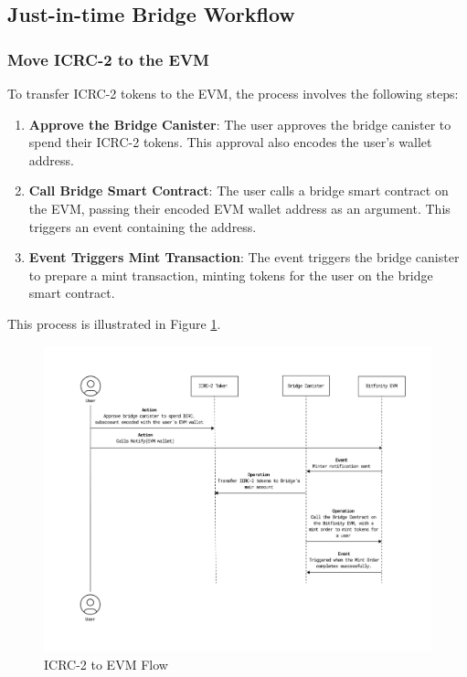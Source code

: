 \documentclass{article}
\begin{document}
\subsection{Just-in-time Bridge Workflow}

\subsubsection{Move ICRC-2 to the EVM}

To transfer ICRC-2 tokens to the EVM, the process involves the following steps:

\begin{enumerate}
\item \textbf{Approve the Bridge Canister}: The user approves the bridge canister to spend their ICRC-2 tokens. This approval also encodes the user's wallet address.
\item \textbf{Call Bridge Smart Contract}: The user calls a bridge smart contract on the EVM, passing their encoded EVM wallet address as an argument. This triggers an event containing the address.
\item \textbf{Event Triggers Mint Transaction}: The event triggers the bridge canister to prepare a mint transaction, minting tokens for the user on the bridge smart contract.
\end{enumerate}

This process is illustrated in Figure \ref{fig
}.

\begin{figure}[H]
\centering
\includegraphics[width=1\linewidth]{icrc-evm.png}
\caption{ICRC-2 to EVM Flow}
\label{fig
}
\end{figure}
\end{document}
